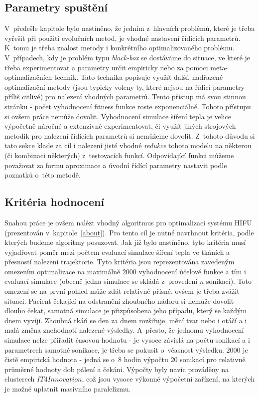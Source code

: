 \subsection{Parametry spuštění}
V~předešle kapitole bylo nastíněno, že jedním z~hlavních problémů, které je třeba vyřešit při použití evolučních metod, je vhodné nastavení řídicích parametrů. K~tomu je třeba znalost metody i konkrétního optimalizovaného problému. V~případech, kdy je problém typu \emph{black-box} se dostáváme do situace, ve které je třeba experimentovat a parametry určit empiricky nebo za pomoci meta-optimalizačních technik. Tato technika popisuje využít další, nadřazené optimalizační metody (jsou typicky voleny ty, které nejsou na řídicí parametry příliš citlivé) pro nalezení vhodných parametrů. Tento přístup má svou stinnou stránku - počet vyhodnocení fitness funkce roste exponenciálně. Tohoto přístupu si ovšem práce nemůže dovolit. Vyhodnocení simulace šíření tepla je velice výpočetně náročné a extenzivně experimentovat, či využít jiných strojových metodik pro nalezení řídicích parametrů si nemůžeme dovolit. Z~tohoto důvodu si tato sekce klade za cíl i nalezení jisté vhodné \emph{redukce} tohoto modelu na některou (či kombinaci některých) z~testovacích funkcí. Odpovídající funkci můžeme považovat za formu aproximace a úvodní řídící parametry nastavit podle poznatků o~této metodě.

\subsection{Kritéria hodnocení}
Snahou práce je ovšem nalézt vhodný algoritmus pro optimalizaci systému HIFU (prezentován v~kapitole~\ref{about}). Pro tento cíl je nutné navrhnout kritéria, podle kterých budeme algoritmy posuzovat. Jak již bylo nastíněno, tyto kritéria musí vyjadřovat poměr mezi počtem evaluací simulace šíření tepla ve tkáních a přesností nalezení trajektorie. Tyto kritéria jsou reprezentována zavedeným omezením optimalizace na maximálně $2000$ vyhodnocení účelové funkce a tím i evaluací simulace (obecně jedna simulace se skládá z~provedení $n$ sonikací). Toto omezení se na první pohled může zdát relativně přísné, ovšem je třeba zvážit situaci. Pacient čekající na odstranění zhoubného nádoru si nemůže dovolit dlouho čekat, samotná simulace je přizpůsobena jeho případu, který se každým dnem vyvíjí. Zhoubná tkáň se den za dnem rozšiřuje, mění tvar nebo i otáčí a i malá změna znehodnotí nalezené výsledky. A~přesto, že jednomu vyhodnocení simulace nelze přiřadit časovou hodnotu - je vysoce závislá na počtu sonikací a i parametrech samotné sonikace, je třeba se pokusit o~včasnost výsledku. $2000$ je čistě empirická hodnota - jedná se o~$8$ hodin výpočtu $20$ sonikací pro relativně průměrné hodnoty dob pálení a čekáni. Výpočty byly navíc prováděny na clusterech $IT4Innovation$, což jsou vysoce výkonné výpočetní zařízení, na kterých je možné uplatnit masivního paralelizmu.

